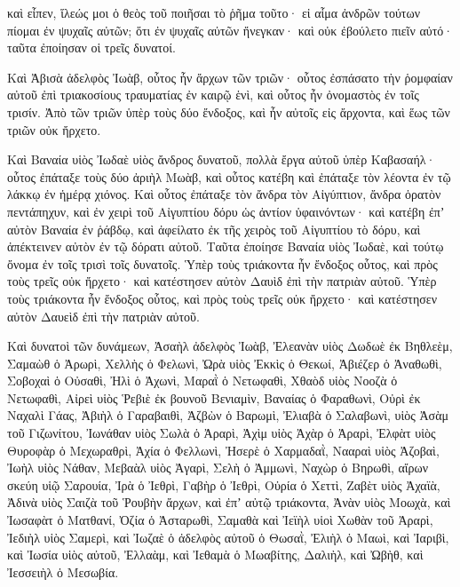 {καὶ εἶπεν, ἵλεώς μοι ὁ θεὸς τοῦ ποιῆσαι τὸ ῥῆμα τοῦτο· εἰ αἷμα ἀνδρῶν τούτων πίομαι ἐν ψυχαῖς αὐτῶν; ὅτι ἐν ψυχαῖς αὐτῶν ἤνεγκαν· καὶ οὐκ ἐβούλετο πιεῖν αὐτό· ταῦτα ἐποίησαν οἱ τρεῖς δυνατοί.
\par }{\PP {}Καὶ Ἀβισὰ ἀδελφὸς Ἰωὰβ, οὗτος ἦν ἄρχων τῶν τριῶν· οὗτος ἐσπάσατο τὴν ῥομφαίαν αὐτοῦ ἐπὶ τριακοσίους τραυματίας ἐν καιρῷ ἑνὶ, καὶ οὗτος ἦν ὀνομαστὸς ἐν τοῖς τρισίν.
Ἀπὸ τῶν τριῶν ὑπὲρ τοὺς δύο ἔνδοξος, καὶ ἦν αὐτοῖς εἰς ἄρχοντα, καὶ ἕως τῶν τριῶν οὐκ ἤρχετο.
\par }{\PP {}Καὶ Βαναία υἱὸς Ἰωδαὲ υἱὸς ἄνδρος δυνατοῦ, πολλὰ ἔργα αὐτοῦ ὑπὲρ Καβασαήλ· οὗτος ἐπάταξε τοὺς δύο ἀριὴλ Μωὰβ, καὶ οὗτος κατέβη καὶ ἐπάταξε τὸν λέοντα ἐν τῷ λάκκῳ ἐν ἡμέρᾳ χιόνος.
Καὶ οὗτος ἐπάταξε τὸν ἄνδρα τὸν Αἰγύπτιον, ἄνδρα ὁρατὸν πεντάπηχυν, καὶ ἐν χειρὶ τοῦ Αἰγυπτίου δόρυ ὡς ἀντίον ὑφαινόντων· καὶ κατέβη ἐπʼ αὐτὸν Βαναία ἐν ῥάβδῳ, καὶ ἀφείλατο ἐκ τῆς χειρὸς τοῦ Αἰγυπτίου τὸ δόρυ, καὶ ἀπέκτεινεν αὐτὸν ἐν τῷ δόρατι αὐτοῦ.
Ταῦτα ἐποίησε Βαναία υἱὸς Ἰωδαὲ, καὶ τούτῳ ὄνομα ἐν τοῖς τρισὶ τοῖς δυνατοῖς. Ὑπὲρ τοὺς τριάκοντα ἦν ἔνδοξος οὗτος, καὶ πρὸς τοὺς τρεῖς οὐκ ἤρχετο· καὶ κατέστησεν αὐτὸν Δαυὶδ ἐπὶ τὴν πατριὰν αὐτοῦ.
Ὑπὲρ τοὺς τριάκοντα ἦν ἔνδοξος οὗτος, καὶ πρὸς τοὺς τρεῖς οὐκ ἤρχετο· καὶ κατέστησεν αὐτὸν Δαυεὶδ ἐπὶ τὴν πατριὰν αὐτοῦ.
\par }{\PP {}Καὶ δυνατοὶ τῶν δυνάμεων, Ἀσαὴλ ἀδελφὸς Ἰωὰβ, Ἐλεανὰν υἱὸς Δωδωὲ ἐκ Βηθλεὲμ,
Σαμαὼθ ὁ Ἀρωρὶ, Χελλὴς ὁ Φελωνὶ,
Ὠρὰ υἱὸς Ἐκκὶς ὁ Θεκωί, Ἀβιέζερ ὁ Ἀναθωθὶ,
Σοβοχαὶ ὁ Οὐσαθὶ, Ἠλὶ ὁ Ἀχωνὶ,
Μαραῒ ὁ Νετωφαθὶ, Χθαὸδ υἱὸς Νοοζὰ ὁ Νετωφαθὶ,
Αἰρεὶ υἱὸς Ῥεβιὲ ἐκ βουνοῦ Βενιαμὶν, Βαναίας ὁ Φαραθωνὶ,
Οὐρὶ ἐκ Ναχαλὶ Γάας, Ἀβιὴλ ὁ Γαραβαιθὶ,
Ἀζβὼν ὁ Βαρωμὶ, Ἐλιαβὰ ὁ Σαλαβωνὶ,
υἱὸς Ἀσὰμ τοῦ Γιζωνίτου, Ἰωνάθαν υἱὸς Σωλὰ ὁ Ἀραρὶ,
Ἀχὶμ υἱὸς Ἀχὰρ ὁ Ἀραρὶ, Ἐλφὰτ υἱὸς Θυροφὰρ
ὁ Μεχωραθρὶ, Ἀχία ὁ Φελλωνὶ,
Ἠσερὲ ὁ Χαρμαδαῒ, Νααραὶ υἱὸς Ἀζοβαὶ,
Ἰωὴλ υἱὸς Νάθαν, Μεβαὰλ υἱὸς Ἀγαρὶ,
Σελὴ ὁ Ἀμμωνὶ, Ναχὼρ ὁ Βηρωθὶ, αἴρων σκεύη υἱῷ Σαρουία,
Ἰρὰ ὁ Ἰεθρὶ, Γαβὴρ ὁ Ἰεθρὶ,
Οὐρία ὁ Χεττὶ, Ζαβὲτ υἱὸς Ἀχαϊὰ,
Ἀδινὰ υἱὸς Σαιζὰ τοῦ Ῥουβὴν ἄρχων, καὶ ἐπʼ αὐτῷ τριάκοντα,
Ἀνὰν υἱὸς Μοωχὰ, καὶ Ἰωσαφὰτ ὁ Ματθανί,
Ὀζία ὁ Ἀσταρωθὶ, Σαμαθὰ καὶ Ἰεϊὴλ υἱοὶ Χωθὰν τοῦ Ἀραρὶ,
Ἰεδιὴλ υἱὸς Σαμερὶ, καὶ Ἰωζαὲ ὁ ἀδελφὸς αὐτοῦ ὁ Θωσαῒ,
Ἐλιὴλ ὁ Μαωὶ, καὶ Ἰαριβὶ, καὶ Ἰωσία υἱὸς αὐτοῦ, Ἐλλαὰμ, καὶ Ἰεθαμὰ ὁ Μωαβίτης,
Δαλιὴλ, καὶ Ὠβὴθ, καὶ Ἰεσσειὴλ ὁ Μεσωβία.

}
